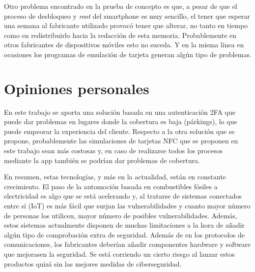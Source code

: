 \documentclass[12pt,a4paper,onecolumn,oneside]{report}
\begin{document}
Otro problema encontrado en la prueba de concepto es que, a pesar de que el proceso de desbloqueo y \textit{root} del smartphone es muy sencillo, el tener que esperar una semana al fabricante utilizado provocó tener que alterar, no tanto en tiempo como en redistribuirlo hacia la redacción de esta memoria. Probablemente en otros fabricantes de dispositivos móviles esto no suceda. Y en la misma línea en ocasiones los programas de emulación de tarjeta generan algún tipo de problemas.


\section*{Opiniones personales}

En este trabajo se aporta una solución basada en una autenticación 2FA que puede dar problemas en lugares donde la cobertura es baja (párkings), lo que puede empeorar la experiencia del cliente. Respecto a la otra solución que se propone, probablemente las simulaciones de tarjetas NFC que se proponen en este trabajo sean más costosas y, en caso de realizarse todos los procesos mediante la app también se podrían dar problemas de cobertura.

En resumen, estas tecnologías, y más en la actualidad, están en constante crecimiento. El paso de la automoción basada en combustibles fósiles a electricidad es algo que se está acelerando y, al tratarse de sistemas conectados entre sí (IoT) es más fácil que surjan las vulnerabilidades y cuanto mayor número de personas los utilicen, mayor número de posibles vulnerabilidades. Además, estos sistemas actualmente disponen de muchas limitaciones a la hora de añadir algún tipo de comprobación extra de seguridad. Además de en los protocolos de comunicaciones, los fabricantes deberían añadir componentes hardware y software que mejorasen la seguridad. Se está corriendo un cierto riesgo al lanzar estos productos quizá sin las mejores medidas de ciberseguridad.



\renewcommand\bibname{Lista de referencias}

\end{document}
